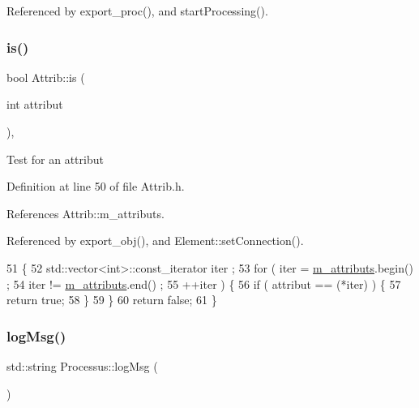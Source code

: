 Referenced by export\+\_\+proc(), and start\+Processing().

\mbox{\label{classAttrib_a704f26af560909ad22065083bb7d4c34}} 
\subsubsection{\texorpdfstring{is()}{is()}}
{\footnotesize\ttfamily bool Attrib\+::is (\begin{DoxyParamCaption}\item[{int}]{attribut }\end{DoxyParamCaption})\hspace{0.3cm}{\ttfamily [inline]}, {\ttfamily [inherited]}}

Test for an attribut 

Definition at line 50 of file Attrib.\+h.



References Attrib\+::m\+\_\+attributs.



Referenced by export\+\_\+obj(), and Element\+::set\+Connection().


\begin{DoxyCode}
51   \{
52     std::vector<int>::const\_iterator iter ;
53     \textcolor{keywordflow}{for} ( iter  = \hyperlink{classAttrib_ac4bd58a0cc6b38a3b711d609a3d3aacc}{m\_attributs}.begin() ;
54           iter != \hyperlink{classAttrib_ac4bd58a0cc6b38a3b711d609a3d3aacc}{m\_attributs}.end()   ;
55           ++iter ) \{
56       \textcolor{keywordflow}{if} ( attribut == (*iter) ) \{
57         \textcolor{keywordflow}{return} \textcolor{keyword}{true};
58       \}
59     \}
60     \textcolor{keywordflow}{return} \textcolor{keyword}{false};
61   \}
\end{DoxyCode}
\mbox{\label{classProcessus_a42fdeb17dc13ba854222666b6aa29b61}} 
\subsubsection{\texorpdfstring{log\+Msg()}{logMsg()}}
{\footnotesize\ttfamily std\+::string Processus\+::log\+Msg (\begin{DoxyParamCaption}{ }\end{DoxyParamCaption})\hspace{0.3cm}{\ttfamily [inline]}}

